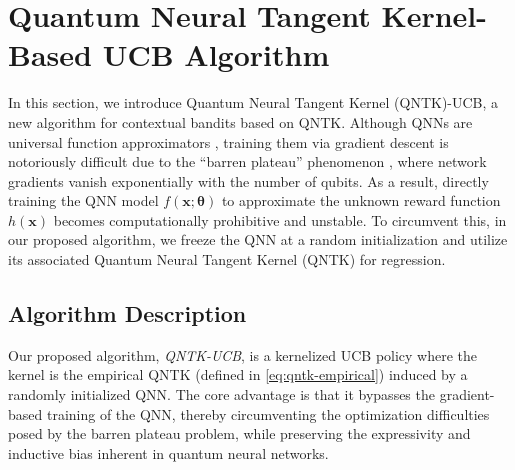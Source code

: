 \documentclass[pdflatex,sn-mathphys-num]{sn-jnl}%
\theoremstyle{thmstyleone}%
\theoremstyle{thmstyletwo}%
\theoremstyle{thmstylethree}%
\newcommand{\xbf}{\mathbf{x}}
\newcommand{\thetabf}{\bm{\theta}}
\begin{document}
\section{Quantum Neural Tangent Kernel-Based UCB Algorithm} \label{qntkucbsec}
In this section, we introduce Quantum Neural Tangent Kernel (QNTK)-UCB, a new algorithm for contextual bandits based on QNTK. Although QNNs are universal function approximators \cite{goto2021universal,gonon2025universal}, training them via gradient descent is notoriously difficult due to the ``barren plateau'' phenomenon \cite{mcclean2018barren}, where network gradients vanish exponentially with the number of qubits.
As a result, directly  training the QNN model $f(\xbf; {\thetabf})$ to approximate the unknown reward function $h(\xbf)$ becomes computationally prohibitive and unstable.
To circumvent this, in our proposed algorithm, we freeze the QNN at a random initialization and utilize its associated Quantum Neural Tangent Kernel (QNTK) for regression.


\subsection{Algorithm Description}

Our proposed algorithm, \emph{QNTK-UCB}, is a kernelized UCB policy where the kernel is the empirical QNTK (defined in \eqref{eq:qntk-empirical}) induced by a randomly initialized QNN. The core advantage is that it bypasses the gradient-based training of the QNN, thereby circumventing the optimization difficulties posed by the barren plateau problem, while preserving the expressivity and inductive bias inherent in quantum neural networks.

\end{document}

